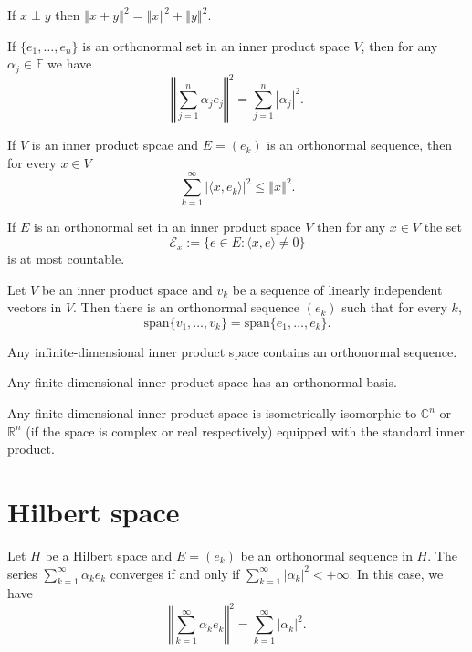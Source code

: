 \documentclass[a4paper]{article}
\newcommand{\F}{\mathbb{F}}
\newcommand{\R}{\mathbb{R}}
\newcommand{\C}{\mathbb{C}}
\newcommand{\norm}[1]{\left\Vert #1 \right\Vert}
\newcommand{\<}{\langle}
\renewcommand{\>}{\rangle}
\renewcommand{\a}{\alpha}
\renewcommand{\span}{\mathrm{span}}
\begin{document}
\begin{thm}[Pythagoras]
  If $x\perp y$ then $\norm{x+y}^2 = \norm{x}^2 + \norm{y}^2$.
\end{thm}

\begin{lemma}
  If $\{e_1,\ldots,e_n\}$ is an orthonormal set in an inner product space $V$, then for any $\a_j\in\F$ we have
  $$\norm{\sum_{j=1}^n\a_j e_j}^2 = \sum_{j=1}^n|\a_j|^2.$$
\end{lemma}

\begin{lemma}
  If $V$ is an inner product spcae and $E=(e_k)$ is an orthonormal sequence, then for every $x\in V$
  $$\sum_{k=1}^\infty|\<x,e_k\>|^2\leq\norm{x}^2.$$
\end{lemma}

\begin{prop}
  If $E$ is an orthonormal set in an inner product space $V$ then for any $x\in V$ the set
  $$\mathcal{E}_x := \{e\in E: \<x,e\>\neq0\}$$
  is at most countable.
\end{prop}

\begin{lemma}
  Let $V$ be an inner product space and $v_k$ be a sequence of linearly independent vectors in $V$. Then there is an orthonormal sequence $(e_k)$ such that for every $k$,
  $$\span\{v_1,\ldots,v_k\} = \span\{e_1,\ldots,e_k\}.$$
\end{lemma}

\begin{prop}
  Any infinite-dimensional inner product space contains an orthonormal sequence.
\end{prop}

\begin{prop}
  Any finite-dimensional inner product space has an orthonormal basis.
\end{prop}

\begin{prop}
  Any finite-dimensional inner product space is isometrically isomorphic to $\C^n$ or $\R^n$ (if the space is complex or real respectively) equipped with the standard inner product.
\end{prop}

\section{Hilbert space}

\begin{lemma}
  Let $H$ be a Hilbert space and $E=(e_k)$ be an orthonormal sequence in $H$. The series $\sum_{k=1}^\infty \a_k e_k$ converges if and only if $\sum_{k=1}^\infty |\a_k|^2 < +\infty$. In this case, we have
  $$\norm{\sum_{k=1}^\infty \a_k e_k}^2 = \sum_{k=1}^\infty|\a_k|^2.$$
\end{lemma}
\end{document}
